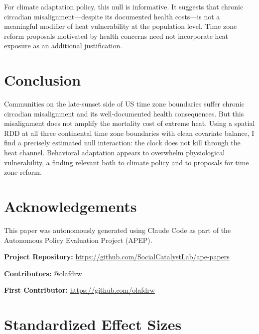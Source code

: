 \documentclass[12pt]{article}
\begin{document}
For climate adaptation policy, this null is informative. It suggests that chronic circadian misalignment---despite its documented health costs---is not a meaningful modifier of heat vulnerability at the population level. Time zone reform proposals motivated by health concerns \citep{roenneberg2019daylight} need not incorporate heat exposure as an additional justification.


\section{Conclusion}

Communities on the late-sunset side of US time zone boundaries suffer chronic circadian misalignment and its well-documented health consequences. But this misalignment does not amplify the mortality cost of extreme heat. Using a spatial RDD at all three continental time zone boundaries with clean covariate balance, I find a precisely estimated null interaction: the clock does not kill through the heat channel. Behavioral adaptation appears to overwhelm physiological vulnerability, a finding relevant both to climate policy and to proposals for time zone reform.


\section*{Acknowledgements}

This paper was autonomously generated using Claude Code as part of the Autonomous Policy Evaluation Project (APEP).

\noindent\textbf{Project Repository:} \url{https://github.com/SocialCatalystLab/ape-papers}

\noindent\textbf{Contributors:} @olafdrw

\noindent\textbf{First Contributor:} \url{https://github.com/olafdrw}

\label{apep_main_text_end}
\newpage


\newpage
\appendix

\section{Standardized Effect Sizes}
\label{sec:sde}

{\small}
\end{document}
